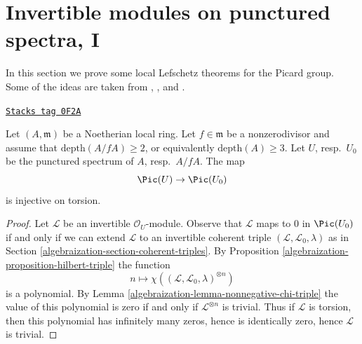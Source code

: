 \section{Invertible modules on punctured spectra, I}
\label{algebraization-section-local-lefschetz-for-pic}
In this section we prove some local Lefschetz theorems for the Picard group.
Some of the ideas are taken from
\cite{Kollar-pic}, \cite{Bhatt-local}, and \cite{Kollar-map-pic}.

\begin{lemma}
\label{algebraization-lemma-injective-torsion-in-pic}
\href{https://stacks.math.columbia.edu/tag/0F2A}{\texttt{Stacks tag 0F2A}}

Let $(A, \mathfrak m)$ be a Noetherian local ring. Let $f \in \mathfrak m$
be a nonzerodivisor and assume that $\text{depth}(A/fA) \geq 2$, or equivalently
$\text{depth}(A) \geq 3$. Let $U$, resp.\ $U_0$ be the punctured
spectrum of $A$, resp.\ $A/fA$. The map
$$
\Pic(U) \to \Pic(U_0)
$$
is injective on torsion.
\end{lemma}

\begin{proof}

Let $\mathcal{L}$ be an invertible $\mathcal{O}_U$-module.
Observe that $\mathcal{L}$ maps to $0$ in $\Pic(U_0)$
if and only if we can extend $\mathcal{L}$ to an invertible
coherent triple $(\mathcal{L}, \mathcal{L}_0, \lambda)$
as in Section \ref{algebraization-section-coherent-triples}.
By Proposition \ref{algebraization-proposition-hilbert-triple}
the function
$$
n \longmapsto \chi((\mathcal{L}, \mathcal{L}_0, \lambda)^{\otimes n})
$$
is a polynomial. By Lemma \ref{algebraization-lemma-nonnegative-chi-triple}
the value of this polynomial is zero if and only if
$\mathcal{L}^{\otimes n}$ is trivial.
Thus if $\mathcal{L}$ is torsion, then this
polynomial has infinitely many zeros, hence is
identically zero, hence $\mathcal{L}$ is trivial.
\end{proof}


